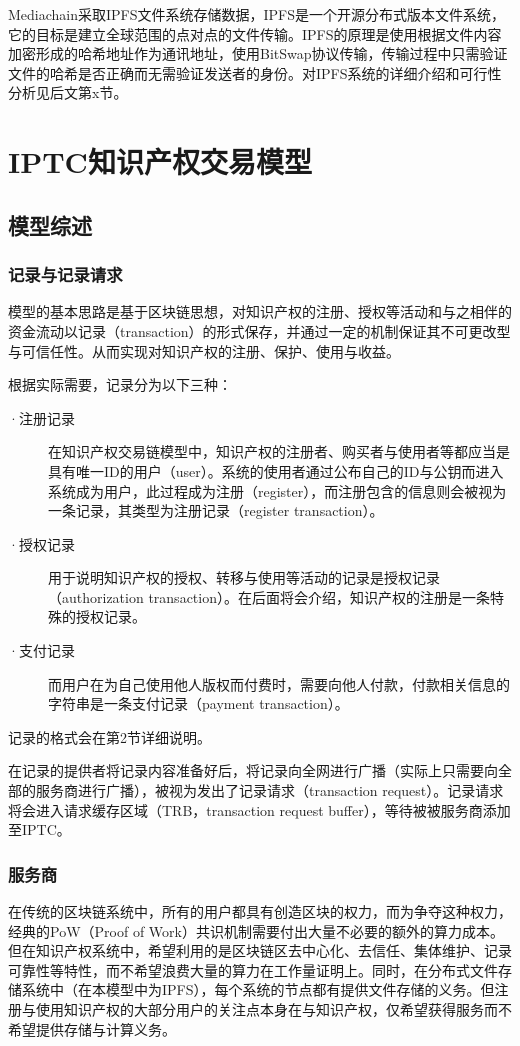 \documentclass[withoutpreface,bwprint]{cumcmthesis} %
\begin{document}
Mediachain采取IPFS文件系统存储数据，IPFS是一个开源分布式版本文件系统，它的目标是建立全球范围的点对点的文件传输。IPFS的原理是使用根据文件内容加密形成的哈希地址作为通讯地址，使用BitSwap协议传输，传输过程中只需验证文件的哈希是否正确而无需验证发送者的身份。对IPFS系统的详细介绍和可行性分析见后文第x节。


\section{IPTC知识产权交易模型}
\subsection{模型综述}
\subsubsection{记录与记录请求}
模型的基本思路是基于区块链思想，对知识产权的注册、授权等活动和与之相伴的资金流动以记录（transaction）的形式保存，并通过一定的机制保证其不可更改型与可信任性。从而实现对知识产权的注册、保护、使用与收益。

根据实际需要，记录分为以下三种：
\begin{description}
	\item[·注册记录] 在知识产权交易链模型中，知识产权的注册者、购买者与使用者等都应当是具有唯一ID的用户（user）。系统的使用者通过公布自己的ID与公钥而进入系统成为用户，此过程成为注册（register），而注册包含的信息则会被视为一条记录，其类型为注册记录（register transaction）。
	\item[·授权记录] 用于说明知识产权的授权、转移与使用等活动的记录是授权记录（authorization transaction）。在后面将会介绍，知识产权的注册是一条特殊的授权记录。
	\item[·支付记录] 而用户在为自己使用他人版权而付费时，需要向他人付款，付款相关信息的字符串是一条支付记录（payment transaction）。
\end{description}
记录的格式会在第2节详细说明。

在记录的提供者将记录内容准备好后，将记录向全网进行广播（实际上只需要向全部的服务商进行广播），被视为发出了记录请求（transaction request）。记录请求将会进入请求缓存区域（TRB，transaction request buffer），等待被被服务商添加至IPTC。

\subsubsection{服务商}
在传统的区块链系统中，所有的用户都具有创造区块的权力，而为争夺这种权力，经典的PoW（Proof of
 Work）共识机制需要付出大量不必要的额外的算力成本。但在知识产权系统中，希望利用的是区块链区去中心化、去信任、集体维护、记录可靠性等特性，而不希望浪费大量的算力在工作量证明上。同时，在分布式文件存储系统中（在本模型中为IPFS），每个系统的节点都有提供文件存储的义务。但注册与使用知识产权的大部分用户的关注点本身在与知识产权，仅希望获得服务而不希望提供存储与计算义务。
 
\end{document}
